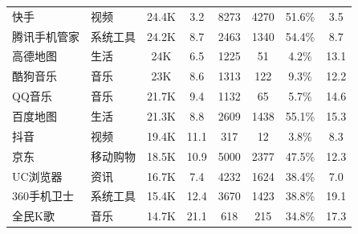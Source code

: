 \begin{ThreePartTable}
\begin{longtable}{l l c c c c c c}
        快手                            & 视频       & 24.4K                      & 3.2                        & 8273           & 4270                       & 51.6\%       & 3.5                        \\
        \rowcolor{gray!15} 腾讯手机管家 & 系统工具   & 24.2K                      & 8.7                        & 2463           & 1340                       & 54.4\%       & 8.7                        \\
        高德地图                        & 生活       & 24K                        & 6.5                        & 1225           & 51                         & 4.2\%        & 13.1                       \\
        \rowcolor{gray!15} 酷狗音乐     & 音乐       & 23K                        & 8.6                        & 1313           & 122                        & 9.3\%        & 12.2                       \\
        QQ音乐                          & 音乐       & 21.7K                      & 9.4                        & 1132           & 65                         & 5.7\%        & 14.6                       \\
        \rowcolor{gray!15} 百度地图     & 生活       & 21.3K                      & 8.8                        & 2609           & 1438                       & 55.1\%       & 15.3                       \\
        抖音                            & 视频       & 19.4K                      & 11.1                       & 317            & 12                         & 3.8\%        & 8.3                        \\
        \rowcolor{gray!15} 京东         & 移动购物   & 18.5K                      & 10.9                       & 5000           & 2377                       & 47.5\%       & 12.3                       \\
        UC浏览器                        & 资讯       & 16.7K                      & 7.4                        & 4232           & 1624                       & 38.4\%       & 7.0                        \\
        \rowcolor{gray!15} 360手机卫士  & 系统工具   & 15.4K                      & 12.4                       & 3670           & 1423                       & 38.8\%       & 19.1                       \\
        全民K歌                         & 音乐       & 14.7K                      & 21.1                       & 618            & 215                        & 34.8\%       & 17.3                       \\

\end{longtable}
\end{ThreePartTable}
